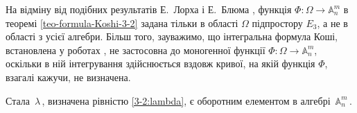 \documentclass[11pt, reqno]{amsart}
\begin{document}
\vskip 1mm


На відміну від подібних результатів Е.~Лорха \cite{Lorch} і
Е.~Блюма \cite{Blum}, функція
$\Phi:\Omega\rightarrow\mathbb{A}_n^m$ в теоремі \ref{teo-formula-Koshi-3-2}
задана тільки в області
$\Omega$ підпростору $E_{3}$, а не в області з усієї алгебри.
Більш того, зауважимо, що інтегральна формула Коші, встановлена у роботах
\cite{Lorch,Blum}, не застосовна до моногенної функції
$\Phi : \Omega\rightarrow\mathbb {A}_n^m$, оскільки в ній інтегрування здійснюється
вздовж кривої, на якій функція $\Phi$, взагалі кажучи, не визначена.


\vskip 1mm



\begin{theorem}\label{3-2:teo-pro-obr-lambda}
 Стала\, $\lambda$\,, визначена рівністю \eqref{3-2:lambda}, є оборотним елементом в алгебрі\, $\mathbb{A}_n^m$\,.
\end{theorem}
\end{document}
